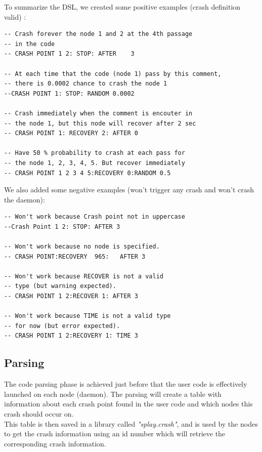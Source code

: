 \documentclass{eplmastersthesis}
\begin{document}
        To summarize the DSL, we created some positive examples (crash definition valid) :

        \begin{lstlisting}[style=MyLua]
-- Crash forever the node 1 and 2 at the 4th passage
-- in the code
-- CRASH POINT 1 2: STOP: AFTER    3

-- At each time that the code (node 1) pass by this comment,
-- there is 0.0002 chance to crash the node 1
--CRASH POINT 1: STOP: RANDOM 0.0002

-- Crash immediately when the comment is encouter in
-- the node 1, but this node will recover after 2 sec
-- CRASH POINT 1: RECOVERY 2: AFTER 0

-- Have 50 % probability to crash at each pass for
-- the node 1, 2, 3, 4, 5. But recover immediately
-- CRASH POINT 1 2 3 4 5:RECOVERY 0:RANDOM 0.5
          \end{lstlisting}

        We also added some negative examples (won't trigger any crash
        and won't crash the daemon):

        \begin{lstlisting}[style=MyLua]
-- Won't work because Crash point not in uppercase
--Crash Point 1 2: STOP: AFTER 3

-- Won't work because no node is specified.
-- CRASH POINT:RECOVERY  965:   AFTER 3

-- Won't work because RECOVER is not a valid
-- type (but warning expected).
-- CRASH POINT 1 2:RECOVER 1: AFTER 3

-- Won't work because TIME is not a valid type
-- for now (but error expected).
-- CRASH POINT 1 2:RECOVERY 1: TIME 3
        \end{lstlisting}

      \subsection{Parsing}

        The code parsing phase is achieved just before that the user code
        is effectively launched on each node (daemon). The parsing will
        create a table with information about each crash point found in the
        user code and which nodes this crash should occur on.\\
        This table is then saved in a library called \textit{"splay.crash"},
        and is used by the nodes to get the crash information using an id
        number which will retrieve the corresponding crash information.\\
\end{document}
